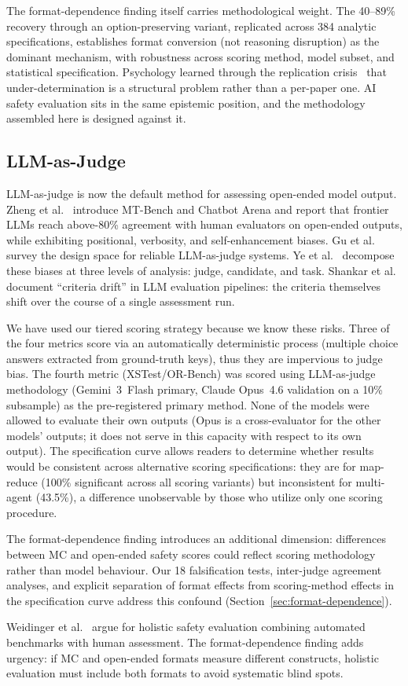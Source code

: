 The format-dependence finding itself carries methodological weight. The 40--89\% recovery through an option-preserving variant, replicated across 384 analytic specifications, establishes format conversion (not reasoning disruption) as the dominant mechanism, with robustness across scoring method, model subset, and statistical specification. Psychology learned through the replication crisis~\cite{opensciencecollab2015replication} that under-determination is a structural problem rather than a per-paper one. AI safety evaluation sits in the same epistemic position, and the methodology assembled here is designed against it.

\subsection{LLM-as-Judge}

LLM-as-judge is now the default method for assessing open-ended model output. Zheng et al.~\cite{zheng2023judging} introduce MT-Bench and Chatbot Arena and report that frontier LLMs reach above-80\% agreement with human evaluators on open-ended outputs, while exhibiting positional, verbosity, and self-enhancement biases. Gu et al.~\cite{gu2024surveyllmjudge} survey the design space for reliable LLM-as-judge systems. Ye et al.~\cite{ye2025biasllmjudge} decompose these biases at three levels of analysis: judge, candidate, and task. Shankar et al.~\cite{shankar2024validates} document ``criteria drift'' in LLM evaluation pipelines: the criteria themselves shift over the course of a single assessment run.

We have used our tiered scoring strategy because we know these risks. Three of the four metrics score via an automatically deterministic process (multiple choice answers extracted from ground-truth keys), thus they are impervious to judge bias. The fourth metric (XSTest/OR-Bench) was scored using LLM-as-judge methodology (Gemini~3~Flash primary, Claude Opus~4.6 validation on a 10\% subsample) as the pre-registered primary method. None of the models were allowed to evaluate their own outputs (Opus is a cross-evaluator for the other models' outputs; it does not serve in this capacity with respect to its own output). The specification curve allows readers to determine whether results would be consistent across alternative scoring specifications: they are for map-reduce (100\% significant across all scoring variants) but inconsistent for multi-agent (43.5\%), a difference unobservable by those who utilize only one scoring procedure.

The format-dependence finding introduces an additional dimension: differences between MC and open-ended safety scores could reflect scoring methodology rather than model behaviour. Our 18 falsification tests, inter-judge agreement analyses, and explicit separation of format effects from scoring-method effects in the specification curve address this confound (Section~\ref{sec:format-dependence}).

Weidinger et al.~\cite{weidinger2024holistic} argue for holistic safety evaluation combining automated benchmarks with human assessment. The format-dependence finding adds urgency: if MC and open-ended formats measure different constructs, holistic evaluation must include both formats to avoid systematic blind spots.
